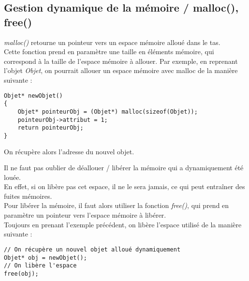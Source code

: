 \documentclass{report}
\begin{document}
\subsection{Gestion dynamique de la mémoire / malloc(), free()}
\emph{malloc()} retourne un pointeur vers un espace mémoire alloué dans le tas.\\
Cette fonction prend en paramètre une taille en éléments mémoire, qui correspond à la taille de l'espace mémoire à allouer.
Par exemple, en reprenant l'objet \emph{Objet}, on pourrait allouer un espace mémoire avec malloc de la manière suivante :
\begin{lstlisting}
Objet* newObjet()
{
    Objet* pointeurObj = (Objet*) malloc(sizeof(Objet));
    pointeurObj->attribut = 1;
    return pointeurObj;
}
\end{lstlisting}
On récupère alors l'adresse du nouvel objet.\\
\par
Il ne faut pas oublier de déallouer / libérer la mémoire qui a dynamiquement été louée.\\
En effet, si on libère pas cet espace, il ne le sera jamais, ce qui peut entraîner des fuites mémoires.\\
Pour libérer la mémoire, il faut alors utiliser la fonction \emph{free()}, qui prend en paramètre un pointeur vers l'espace mémoire à libérer.\\
Toujours en prenant l'exemple précédent, on libère l'espace utilisé de la manière suivante :
\begin{lstlisting}
// On récupère un nouvel objet alloué dynamiquement
Objet* obj = newObjet();
// On libère l'espace
free(obj);
\end{lstlisting}
\end{document}
